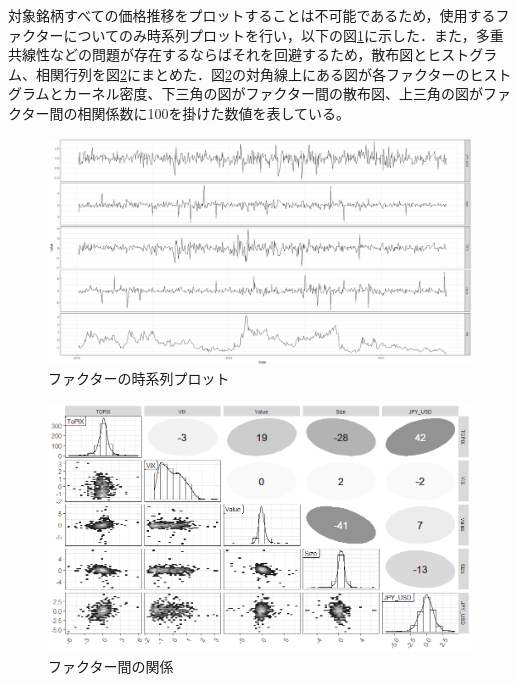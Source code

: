 \documentclass[11pt]{jreport}
\begin{document}
対象銘柄すべての価格推移をプロットすることは不可能であるため，使用するファクターについてのみ時系列プロットを行い，以下の図\ref{fig:factor_plot}に示した．また，多重共線性などの問題が存在するならばそれを回避するため，散布図とヒストグラム、相関行列を図\ref{fig:factor_cor}にまとめた．図\ref{fig:factor_cor}の対角線上にある図が各ファクターのヒストグラムとカーネル密度、下三角の図がファクター間の散布図、上三角の図がファクター間の相関係数に100を掛けた数値を表している。

\begin{figure}[H]
	\begin{center}
		\includegraphics[width=15cm]{./fig/factor_plot.png}
		\caption{ファクターの時系列プロット}
		\label{fig:factor_plot}
	\end{center}
\end{figure}

\begin{figure}[H]
	\begin{center}
		\includegraphics[width=15cm]{./fig/factor_cor.png}
		\caption{ファクター間の関係}
		\label{fig:factor_cor}
	\end{center}
\end{figure}
\end{document}
